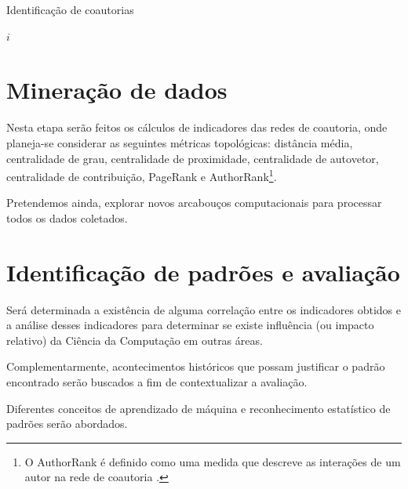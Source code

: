 \begin{algorithm}
\caption{Identificação de coautorias}
\label{alg:levenshtein}
\begin{algorithmic}[1]

\State \Return $i$
\EndProcedure

\end{algorithmic}
\end{algorithm}

\section{Mineração de dados}

Nesta etapa serão feitos os cálculos de indicadores das redes de coautoria, onde planeja-se considerar as seguintes métricas topológicas: distância média, centralidade de grau, centralidade de proximidade, centralidade de autovetor, centralidade de contribuição, PageRank e AuthorRank\footnote{O AuthorRank é definido como uma medida que descreve as interações de um autor na rede de coautoria \cite{liu2005co}.}.

Pretendemos ainda, explorar novos arcabouços computacionais para processar todos os dados coletados.

\section{Identificação de padrões e avaliação}

Será determinada a existência de alguma correlação entre os indicadores obtidos e a análise desses indicadores para determinar se existe influência (ou impacto relativo) da Ciência da Computação em outras áreas.

Complementarmente, acontecimentos históricos que possam justificar o padrão encontrado serão buscados a fim de contextualizar a avaliação.

Diferentes conceitos de aprendizado de máquina e reconhecimento estatístico de padrões serão abordados.
